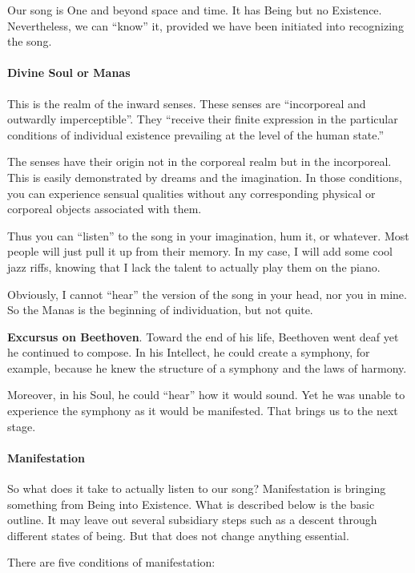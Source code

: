 Our song is One and beyond space and time. It has Being but no Existence. Nevertheless, we can ``know'' it, provided we have been initiated into recognizing the song.

\paragraph{Divine Soul or Manas}


This is the realm of the inward senses. These senses are ``incorporeal and outwardly imperceptible''. They ``receive their finite expression in the particular conditions of individual existence prevailing at the level of the human state.''

The senses have their origin not in the corporeal realm but in the incorporeal. This is easily demonstrated by dreams and the imagination. In those conditions, you can experience sensual qualities without any corresponding physical or corporeal objects associated with them.

Thus you can ``listen'' to the song in your imagination, hum it, or whatever. Most people will just pull it up from their memory. In my case, I will add some cool jazz riffs, knowing that I lack the talent to actually play them on the piano.

Obviously, I cannot ``hear'' the version of the song in your head, nor you in mine. So the Manas is the beginning of individuation, but not quite.

\textbf{Excursus on Beethoven}. Toward the end of his life, Beethoven went deaf yet he continued to compose. In his Intellect, he could create a symphony, for example, because he knew the structure of a symphony and the laws of harmony.

Moreover, in his Soul, he could ``hear'' how it would sound. Yet he was unable to experience the symphony as it would be manifested. That brings us to the next stage.

\paragraph{Manifestation}


So what does it take to actually listen to our song? Manifestation is bringing something from Being into Existence. What is described below is the basic outline. It may leave out several subsidiary steps such as a descent through different states of being. But that does not change anything essential.

There are five conditions of manifestation:


